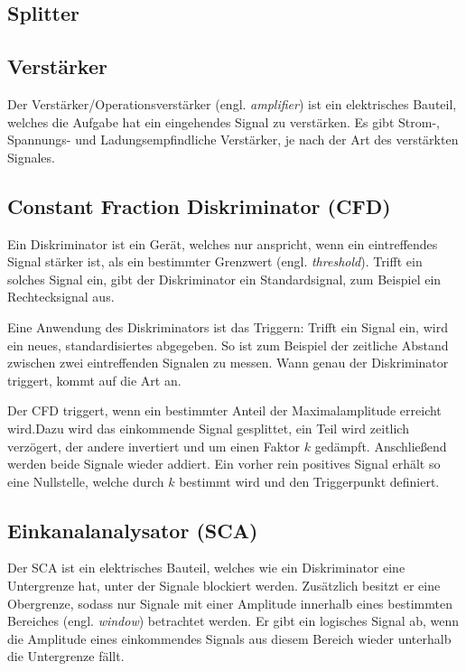 \subsection{Splitter}

\subsection{Verstärker}

Der Verstärker/Operationsverstärker (engl. \emph{amplifier}) ist ein
elektrisches Bauteil, welches die Aufgabe hat ein eingehendes Signal zu
verstärken. Es gibt Strom-, Spannungs- und Ladungsempfindliche Verstärker, je
nach der Art des verstärkten Signales.


\subsection{Constant Fraction Diskriminator (CFD)}

Ein Diskriminator ist ein Gerät, welches nur anspricht, wenn ein eintreffendes
Signal stärker ist, als ein bestimmter Grenzwert (engl. \emph{threshold}).
Trifft ein solches Signal ein, gibt der Diskriminator ein Standardsignal, zum
Beispiel ein Rechtecksignal aus.

Eine Anwendung des Diskriminators ist das Triggern: Trifft ein Signal ein, wird
ein neues, standardisiertes abgegeben. So ist zum Beispiel der zeitliche
Abstand zwischen zwei eintreffenden Signalen zu messen. Wann genau der
Diskriminator triggert, kommt auf die Art an.

Der CFD triggert, wenn ein bestimmter Anteil der Maximalamplitude erreicht
wird.Dazu wird das einkommende Signal gesplittet, ein Teil wird zeitlich
verzögert, der andere invertiert und um einen Faktor $k$ gedämpft. Anschließend
werden beide Signale wieder addiert. Ein vorher rein positives Signal erhält so
eine Nullstelle, welche durch $k$ bestimmt wird und den Triggerpunkt definiert.

\subsection{Einkanalanalysator (SCA)}

Der SCA ist ein elektrisches Bauteil, welches wie ein Diskriminator eine
Untergrenze hat, unter der Signale blockiert werden. Zusätzlich besitzt er eine
Obergrenze, sodass nur Signale mit einer Amplitude innerhalb eines bestimmten
Bereiches (engl. \emph{window}) betrachtet werden. Er gibt ein logisches Signal
ab, wenn die Amplitude eines einkommendes Signals aus diesem Bereich wieder
unterhalb die Untergrenze fällt.

